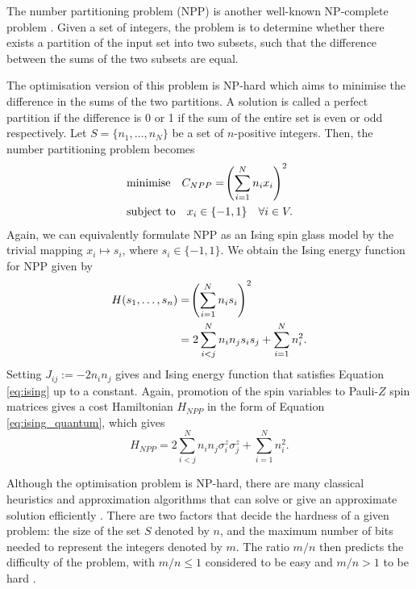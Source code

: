         The number partitioning problem (NPP) is another well-known NP-complete problem \cite{karp2010reducibility}. Given a set of integers, the problem is to determine whether there exists a partition of the input set into two subsets, such that the difference between the sums of the two subsets are equal.

        The optimisation version of this problem is NP-hard which aims to minimise the difference in the sums of the two partitions. A solution is called a perfect partition if the difference is 0 or 1 if the sum of the entire set is even or odd respectively. Let $S=\{n_1,\dots,n_N\}$ be a set of $n$-positive integers. Then, the number partitioning problem becomes
        \begin{align}
        \begin{split}
                &\text{minimise} \quad  C_{NPP}=\lr(){\sum_{i=1}^Nn_ix_i}^2 \\
                &\text{subject to} \quad x_i\in\{-1,1\}\quad\forall i\in V.
        \end{split}
        \end{align}
        Again, we can equivalently formulate NPP as an Ising spin glass model by the trivial mapping $x_i\mapsto s_i$, where $s_i\in\{-1,1\}$. We obtain the Ising energy function for NPP given by 
        \begin{align}
            \begin{split}
                H(s_1,\dots,s_n) &= \lr(){\sum^N_{i=1}n_is_i}^2 \\
                &= 2\sum^N_{i<j} n_in_js_is_j + \sum^N_{i=1}n_i^2.
            \end{split}
        \end{align}
        Setting $J_{ij}:=-2n_in_j$ gives and Ising energy function that satisfies Equation \ref{eq:ising} up to a constant. Again, promotion of the spin variables to Pauli-$Z$ spin matrices gives a cost Hamiltonian $H_{NPP}$ in the form of Equation \ref{eq:ising_quantum}, which gives
        \begin{equation}
            H_{NPP} = 2\sum^N_{i<j} n_in_j\sigma^z_i\sigma^z_j + \sum^N_{i=1}n_i^2.
        \end{equation}

        Although the optimisation problem is NP-hard, there are many classical heuristics and approximation algorithms that can solve or give an approximate solution efficiently \cite{korf2009multi}. There are two factors that decide the hardness of a given problem: the size of the set $S$ denoted by $n$, and the maximum number of bits needed to represent the integers denoted by $m$. The ratio $m/n$ then predicts the difficulty of the problem, with $m/n\leq 1$ considered to be easy and $m/n>1$ to be hard \cite{hayes2002computing}.
